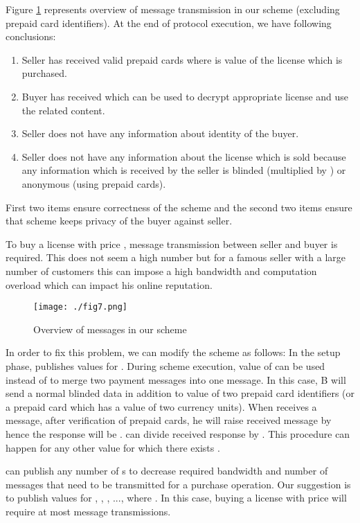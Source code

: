 \documentclass[times]{secauth}
\begin{document}
Figure \ref{fig_messages} represents overview of message transmission in our scheme (excluding prepaid card identifiers).
At the end of protocol execution, we have following conclusions:
\begin{enumerate}
\item Seller has received  valid prepaid cards where  is value of the license which is purchased.
\item Buyer has received  which can be used to decrypt appropriate license and use the related content.
\item Seller does not have any information about identity of the buyer.
\item Seller does not have any information about the license which is sold because any information which is received by the seller is blinded (multiplied by ) or anonymous (using prepaid cards).
\end{enumerate}
	
First two items ensure correctness of the scheme and the second two items ensure that scheme keeps privacy of the buyer against seller.

To buy a license with price ,  message transmission between seller and buyer is required. This does not seem a high number but for a famous seller with a large number of customers this can impose a high bandwidth and computation overload which can impact his online reputation.

\begin{figure}
\centering
\texttt{[image: ./fig7.png]}
\caption{Overview of messages in our scheme}
\label{fig_messages}
\end{figure}

In order to fix this problem, we can modify the scheme as follows:
In the setup phase,  publishes values for . During scheme execution, value of  can be used instead of  to merge two payment messages into one message. In this case, B will send a normal blinded data in addition to value of two prepaid card identifiers (or a prepaid card which has a value of two currency units). 
When  receives a message, after verification of prepaid cards, he will raise received message  by  hence the response will be .  can divide received response by . This procedure can happen for any other value  for which there exists .

 can publish any number of s to decrease required bandwidth and number of messages that need to be transmitted for a purchase operation. Our suggestion is to publish values for , , , ...,  where . In this case, buying a license with price  will require at most  message transmissions.
\end{document}
